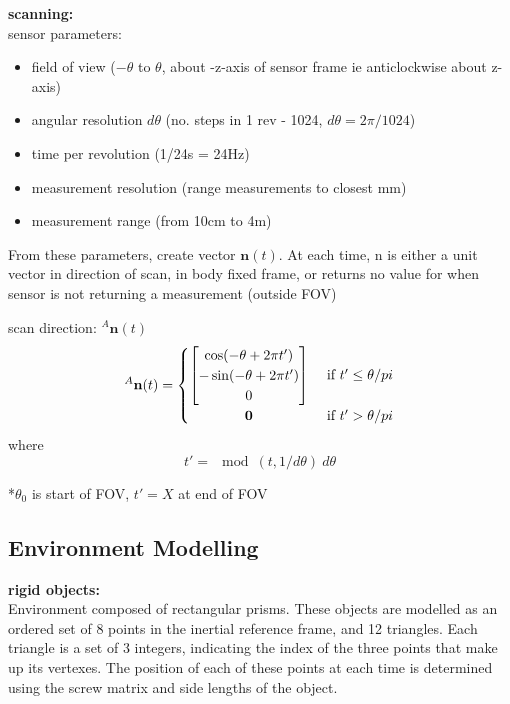 \textbf{scanning:}\\
sensor parameters:
\begin{itemize}
\item field of view ($-\theta$ to $\theta$, about -z-axis of sensor frame ie anticlockwise about z-axis)
\item angular resolution $d\theta$ (no. steps in 1 rev - 1024, $d\theta = 2\pi/1024$)
\item time per revolution (1/24s = 24Hz)
\item measurement resolution (range measurements to closest mm)
\item measurement range (from 10cm to 4m)
\end{itemize}
From these parameters, create vector $\mathbf{n}(t)$. At each time, n is either a unit vector in direction of scan, in body fixed frame, or returns no value for when sensor is not returning a measurement (outside FOV)

scan direction: $^{A}\mathbf{n}(t)$
\begin{equation}
^{A}\mathbf{n}(t) =
	\begin{cases} 
	      \hfill \begin{bmatrix}
	      		\cos(-\theta + 2\pi t') \\
	      		-\sin(-\theta + 2\pi t') \\
	      		0
	      	\end{bmatrix}    \hfill & \text{ if $t' \leq \theta/pi$} \\
	      \hfill \mathbf{0} \hfill & \text{ if $t' > \theta/pi$} \\
	\end{cases} 
\end{equation}
where
\begin{equation}
t' = \mod(t,1/d\theta)\:d\theta
\end{equation}

*$\theta_0$ is start of FOV, $t'=X$ at end of FOV

\subsection{Environment Modelling}

\textbf{rigid objects:}\\
Environment composed of rectangular prisms. These objects are modelled as an ordered set of 8 points in the inertial reference frame, and 12 triangles. Each triangle is a set of 3 integers, indicating the index of the three points that make up its vertexes.
The position of each of these points at each time is determined using the screw matrix and side lengths of the object.

